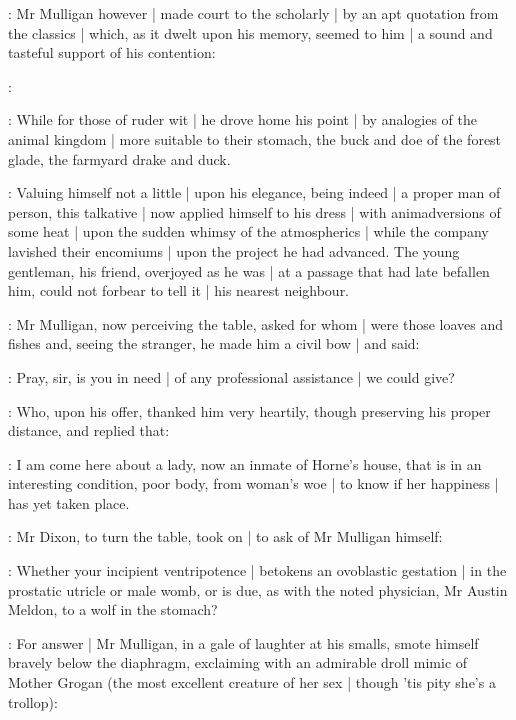 :
Mr Mulligan however |
made court to the scholarly |
by an apt quotation from the classics |
which,
as it dwelt upon his memory,
seemed to him |
a sound and tasteful support of his contention:

\mulligan:

:
While for those of ruder wit |
he drove home his point |
by analogies of the animal kingdom |
more suitable to their stomach,
the buck and doe of the forest glade,
the farmyard drake and duck.


:
Valuing himself not a little |
upon his elegance,
being indeed |
a proper man of person,
this talkative |
now applied himself to his dress |
with animadversions of some heat |
upon the sudden whimsy of the atmospherics |
while the company lavished their encomiums |
upon the project he had advanced.
The young gentleman,
his friend,
overjoyed as he was |
at a passage that had late befallen him,
could not forbear to tell it |
his nearest neighbour.

:
Mr Mulligan,
now perceiving the table,
asked for whom |
were those loaves and fishes
and,
seeing the stranger,
he made him a civil bow |
and said:

\mulligan:
 Pray,
sir,
is you in need |
of any professional assistance |
we could give?

:
Who,
upon his offer,
thanked him very heartily,
though preserving his proper distance,
and replied that:

\Bloom:
I am come here about a lady,
now an inmate of Horne's house,
that is in an interesting condition,
poor body,
from woman's woe  |
to know if her happiness |
has yet taken place.

:
Mr Dixon,
to turn the table,
took on |
to ask of Mr Mulligan himself:

\dixon:
Whether your incipient ventripotence |
betokens an ovoblastic gestation |
in the prostatic utricle or male womb,
or is due,
as with the noted physician,
Mr Austin Meldon,
to a wolf in the stomach?%

:
For answer |
Mr Mulligan,
in a gale of laughter at his smalls,
smote himself bravely below the diaphragm,
exclaiming with an admirable droll mimic of Mother Grogan
(the most excellent creature of her sex |
though 'tis pity she's a trollop):

